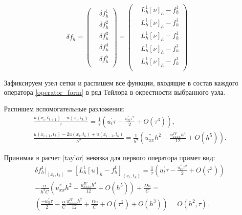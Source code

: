 {{		\begin{equation}\label{discrepancy}
			\delta f_h =
			\left(\begin{split}
				& \delta f^1_h \\
				& \delta f^2_h \\
				& \delta f^3_h \\
				& \delta f^4_h \\
				& \delta f^5_h \\
				\end{split}
			\right) 
			=
			\left(\begin{split}
				& {L^1_h[\nu]_h - f^1_h} \\
				& {L^1_h[\nu]_h - f^1_h} \\
				& {L^1_h[\nu]_h - f^1_h} \\
				& {L^1_h[\nu]_h - f^1_h} \\
				& {L^1_h[\nu]_h - f^1_h} \\
				\end{split}
			\right) 
		\end{equation}
		
		Зафиксируем узел сетки и распишем все функции, входящие в состав каждого оператора \eqref{operator_form} в ряд Тейлора в окрестности выбранного узла. 
		
		
		Распишем вспомогательные разложения:
		\begin{equation}\label{taylor}
				\begin{split}
				&\frac{ u( x_i, t_{k+1} ) - u(x_i, t_k) }{ \tau } = \frac{1}{\tau} (u^{'}_t \tau - \frac{ u^{''}_{tt} \tau^2 }{ 2 } + O(\tau^3)),\\
				&\frac{ u( x_{i+1}, t_{k} ) - 2u(x_i, t_k) + u( x_{i-1}, t_{k} ) }{ h^2 } =  \frac{1}{h^2} (u^{''}_{xx} h^2 - \frac{ u^{IV}_{xxxx} h^4 }{ 12 } + O(h^5)).
				\end{split}
			\end{equation}
			
		Принимая в расчет \eqref{taylor} невязка для первого оператора примет вид:
		\begin{align}\label{taylor_1}
 &\delta f^1_h|_{ (x_i, t_k ) } = [ L^1_h[u]_h - f^1_h ]_{ (x_i, t_k ) } = \frac{1}{\tau}(u^{'}_t \tau - \frac{ u^{''}_{tt} \tau^2 }{ 2 } + O(\tau^3))\nonumber\\
			 & - \frac{\alpha}{h^2C}(u^{''}_{xx} h^2 - \frac{ u^{IV}_{xxxx} h^4 }{ 12 } + O(h^5)) + \frac{Du}{C} = \nonumber\\
			 &( \frac{- u^{''}_{tt} \tau }{ 2 } - \frac{\alpha}{C} \frac{ u^{IV}_{xxxx} h^2 }{ 12 } + \frac{Du}{C} + O(\tau^2) + O(h^3)) = O(h^2, \tau)\nonumber.
		\end{align}
		
}}

